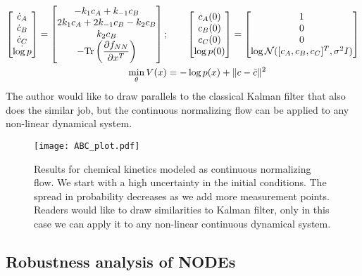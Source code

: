 \documentclass[fontsize=11pt]{article}
\newcommand{\norm}[1]{\lVert #1 \rVert}
\theoremstyle{definition}
\begin{document}
\begin{align}
    \begin{bmatrix} \dot{c}_A \\ \dot{c}_B \\ \dot{c}_C \\ \dot{\log p} \end{bmatrix}
    = \begin{bmatrix}
        -k_{1}c_A + k_{-1}c_B  \\
        2k_{1}c_A +  2k_{-1}c_B - k_2c_B \\
        k_{2}c_B\\
        -\mathrm{Tr} \left(\dfrac{\partial f_{NN}}{\partial x^T}\right)
    \end{bmatrix};
    &\qquad
    \begin{bmatrix} c_A(0) \\ c_B(0) \\ c_C(0) \\ \log p(0) \end{bmatrix} =
    \begin{bmatrix} 1 \\ 0 \\ 0 \\ \log{\mathcal{N}([c_A, c_B, c_C]^T, \sigma^2I)} \end{bmatrix} \notag \\
    \min\limits_{\theta} V(x) &= -\log p(x) + \norm{c - \tilde{c}}^2
\end{align}
The author would like to draw parallels to the classical Kalman filter \citep{kalman:1960} that also does the similar job,
but the continuous normalizing flow can be applied to any non-linear dynamical system.
\begin{figure}[h]
    \centering
    \texttt{[image: ABC\_plot.pdf]} 
    \caption{Results for chemical kinetics modeled as continuous normalizing
    flow. We start with a high uncertainty in the initial conditions. The spread in 
    probability decreases as we add more measurement points. Readers would like
    to draw similarities to Kalman filter, only in this case we can apply it to 
    any non-linear continuous dynamical system.}
    \label{fig:cnf}
\end{figure}

\subsection{Robustness analysis of NODEs}
\end{document}
